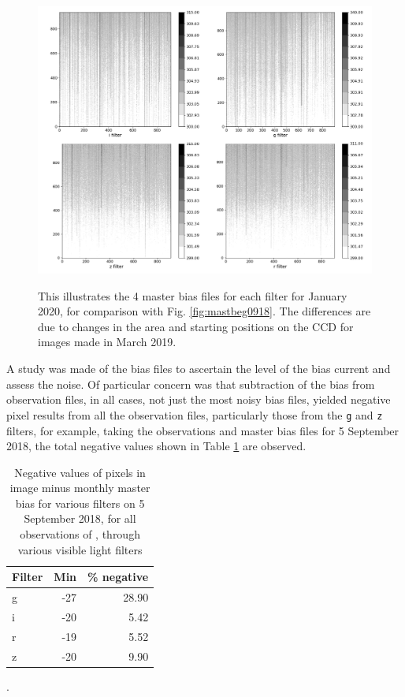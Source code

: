 \begin{figure}[!htbp]
\begin{center}
\includegraphics[scale=0.4]{images/mastbiaseg0120.png}
\end{center}   
\caption{This illustrates the 4 master bias files for each filter for January
2020, for comparison with Fig. \ref{fig:mastbeg0918}. The differences are due
to changes in the area and starting positions on the CCD for images made in
March 2019.}
\protect\label{fig:mastbeg0120}
\end{figure}

A study was made of the bias files to ascertain the level of the bias current
and assess the noise. Of particular concern was that subtraction of the bias
from observation files, in all cases, not just the most noisy bias files, yielded
negative pixel results from all the observation files, particularly those from
the \texttt{g} and \texttt{z} filters, for example, taking the
observations and master bias files for 5  September 2018, the total negative values shown in 
Table \ref{table:negmast} are observed.

\begin{table}[!htbp]
\begin{center}
\begin{tabular}{lrr} \hline
Filter & Min & \% negative \\\hline
g & -27 & 28.90 \\
i & -20 & 5.42 \\
r & -19 & 5.52 \\
z & -20 & 9.90 \\
\hline
\end{tabular}
\end{center}
\caption{Negative values of pixels in image minus monthly master bias for
various filters on 5 September 2018, for all observations of \bstar, through
various visible light filters}.
\protect\label{table:negmast}
\end{table}

